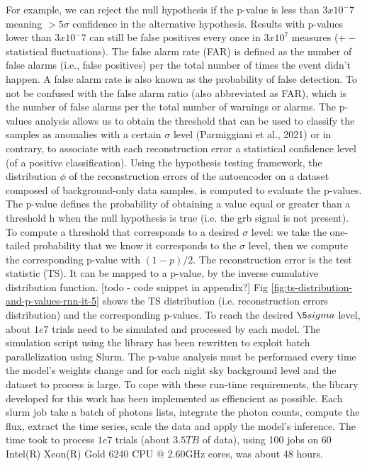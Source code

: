 For example, we can reject the null hypothesis if the p-value is less than $3x10^-7$ meaning $> 5\sigma$ confidence in the alternative hypothesis. 
Results with p-values lower than $3x10^-7$ can still be false positives every once in $3x10^7$ measures ($+-$ statistical fluctuations).
The false alarm rate (FAR) is defined as the number of false alarms (i.e., false positives) per the total number of times the event didn't happen. A false alarm rate is also known as the probability of false detection. To not be confused with the false alarm ratio (also abbreviated as FAR), which is the number of false alarms per the total number of warnings or alarms.
The p-values analysis allows us to obtain the threshold that can be used to classify the samples as anomalies with a certain $\sigma$ level (Parmiggiani et al., 2021) or in contrary, to associate with each reconstruction error a statistical confidence level (of a positive classification). Using the hypothesis testing framework, the distribution $\phi$ of the reconstruction errors of the autoencoder on a dataset composed of background-only data samples, is computed to evaluate the p-values. The p-value defines the probability of obtaining a value equal or greater than a threshold h when the null hypothesis is true (i.e. the grb signal is not present). 
To compute a threshold that corresponds to a desired $\sigma$ level: we take the one-tailed probability that we know it corresponds to the $\sigma$ level, then we compute the corresponding p-value with $(1-p)/2$. 
The reconstruction error is the test statistic (TS). It can be mapped to a p-value, by the inverse cumulative distribution function. [todo - code snippet in appendix?] Fig \ref{fig:ts-distribution-and-p-values-rnn-it-5} shows the TS distribution (i.e. reconstruction errors distribution) and the corresponding p-values. To reach the desired $\5sigma$ level, about $1e7$ trials need to be simulated and processed by each model. The simulation script using the \cite{dipiano2022ctasagsci} library has been rewritten to exploit batch parallelization using Slurm. The p-value analysis must be performaed every time the model's weights change and for each night sky background level and the dataset to process is large. To cope with these run-time requirements, the library developed for this work has been implemented as effiencient as possible. Each slurm job take a batch of photons lists, integrate the photon counts, compute the flux, extract the time series, scale the data and apply the model's inference. The time took to process $1e7$ trials (about $3.5 TB$ of data), using 100 jobs on 60 Intel(R) Xeon(R) Gold 6240 CPU @ 2.60GHz cores, was about 48 hours. 

